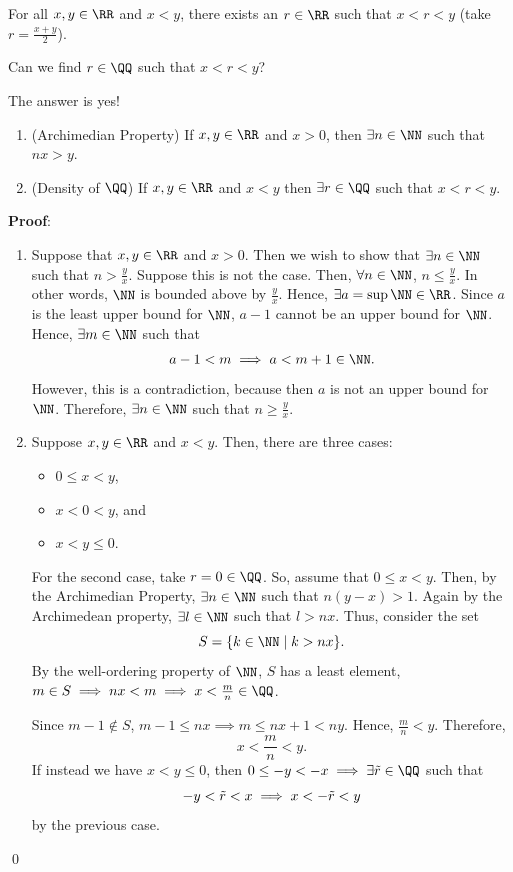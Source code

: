 
\noindent For all $x,y\in \RR$ and $x<y$, there exists an $r\in \RR$ such that $x<r<y$ (take $r = \frac{x+y}{2}$). 
\begin{question}
Can we find $r\in \QQ$ such that $x<r<y$?
\end{question}

\begin{theorem}
The answer is yes!
\begin{enumerate}[label = \roman*)]
    \item (Archimedian Property) If $x,y\in \RR$ and $x>0$, then $\exists n\in \NN$ such that $nx>y$.
    \item (Density of $\QQ$) If $x,y\in \RR$ and $x<y$ then $\exists r\in \QQ$ such that $x<r<y$.
\end{enumerate}
\end{theorem}
\textbf{Proof}: 
\begin{enumerate}[label = \roman*)]
    \item Suppose that $x,y\in \RR$ and $x>0$. Then we wish to show that $\exists n\in \NN$ such that $n>\frac{y}{x}$. Suppose this is not the case. Then, $\forall n\in \NN$, $n\leq \frac{y}{x}$. In other words, $\NN$ is bounded above by $\frac{y}{x}$. Hence, $\exists a = \sup \NN\in \RR$. Since $a$ is the least upper bound for $\NN$, $a-1$ cannot be an upper bound for $\NN$. Hence, $\exists m\in \NN$ such that 
    \[
        a-1<m \implies a<m+1\in \NN.
    \]
    However, this is a contradiction, because then $a$ is not an upper bound for $\NN$. Therefore, $\exists n \in \NN$ such that $n\geq \frac{y}{x}$.
    \item Suppose $x,y\in \RR$ and $x<y$. Then, there are three cases:
    \begin{itemize}
        \item $0\leq x<y$,
        \item $x<0<y$, and 
        \item $x<y\leq 0$.
    \end{itemize}
    For the second case, take $r=0\in \QQ$. So, assume that $0\leq x<y$. Then, by the Archimedian Property, $\exists n\in \NN$ such that $n(y-x)>1.$ Again by the Archimedean property, $\exists l\in \NN$ such that $l>nx$. Thus, consider the set
    \[
    S = \{k\in \NN \mid k>nx\}.
    \]
    By the well-ordering property of $\NN$, $S$ has a least element, $m\in S\implies nx<m \implies x<\frac{m}{n}\in \QQ$.
    
    Since $m-1\notin S$, $m-1\leq nx\implies m\leq nx+1<ny$. Hence, $\frac{m}{n}<y$. Therefore,
    \[
    x<\frac{m}{n}<y.
    \]
    If instead we have $x<y\leq 0$, then $0\leq -y <-x \implies \exists \Tilde{r}\in \QQ$ such that 
    \[
    -y<\Tilde{r}< x \implies x<-\Tilde{r}< y
    \]
    by the previous case. 
\end{enumerate}
\qed 

